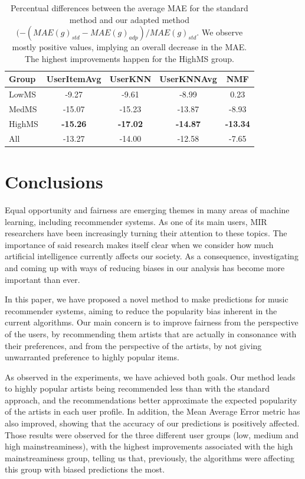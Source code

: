 \documentclass{article}
\begin{document}
\begin{table}[ht]
\centering
\vspace{1.1}
\setlength\tabcolsep{1.5pt} 
\begin{tabular}{l | cccc}
  \hline
  \hline
  Group & UserItemAvg & UserKNN & UserKNNAvg & NMF \\ 
  \hline
  LowMS      & -9.27   & -9.61    & -8.99       & 0.23 \\
  MedMS      & -15.07  & -15.23   & -13.87      & -8.93 \\
  HighMS     & \textbf{-15.26}  & \textbf{-17.02}   & \textbf{-14.87}      & \textbf{-13.34} \\
  \hline
  All        & -13.27  & -14.00   & -12.58      & -7.65 \\
   \hline
   \hline
\end{tabular}
\caption{Percentual differences between the average MAE for the standard method and our adapted method $(-(MAE(g)_{std} - MAE(g)_{adp})/MAE(g)_{std}$. We observe mostly
positive values, implying an overall decrease in the MAE. The highest improvements happen for the HighMS group.}
\label{tab:mae_delta}
\end{table}



\section{Conclusions}\label{sec:discussion}

Equal opportunity and fairness are emerging themes in 
many areas of machine learning, including recommender
systems. As one of its main users, MIR researchers have
been increasingly turning their attention to these 
topics. The importance of said research makes itself 
clear when we consider how much artificial intelligence
currently affects our society. As a consequence, 
investigating and coming up with ways of reducing biases 
in our analysis has become more important than ever.

In this paper, we have proposed a novel method to 
make predictions for music recommender systems, aiming to reduce the popularity bias inherent in the current algorithms. Our 
main concern is to improve fairness from the
perspective of the users, by recommending them artists
that are actually in consonance with their preferences, 
and from the perspective of the artists, by not 
giving unwarranted preference to highly popular 
items. 

As observed in the experiments, we have achieved both goals. Our method leads to highly popular artists being recommended less
than with the standard approach, and the recommendations better
approximate the expected popularity of the artists in
each user profile. In addition, the Mean Average Error
metric has also improved, showing that the accuracy of 
our predictions is positively affected. Those results
were observed for the three different user groups
(low, medium and high mainstreaminess), with the 
highest improvements associated with the high mainstreaminess
group, telling us that, previously, the algorithms
were affecting this group with biased predictions the most.
\end{document}
